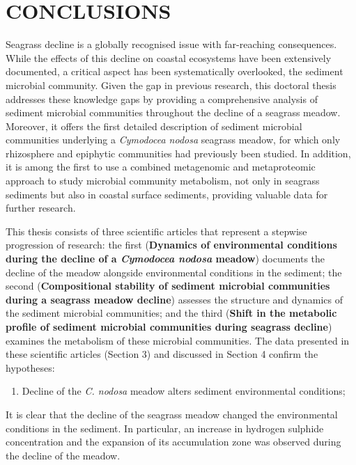 \documentclass[
  12 pt,
]{book}
\providecommand{\tightlist}{%
  \setlength{\itemsep}{0pt}\setlength{\parskip}{0pt}}
\begin{document}
\hypertarget{conclusions}{%
\chapter{CONCLUSIONS}\label{conclusions}}

Seagrass decline is a globally recognised issue with far-reaching consequences. While the effects of this decline on coastal ecosystems have been extensively documented, a critical aspect has been systematically overlooked, the sediment microbial community. Given the gap in previous research, this doctoral thesis addresses these knowledge gaps by providing a comprehensive analysis of sediment microbial communities throughout the decline of a seagrass meadow. Moreover, it offers the first detailed description of sediment microbial communities underlying a \emph{Cymodocea nodosa} seagrass meadow, for which only rhizosphere and epiphytic communities had previously been studied. In addition, it is among the first to use a combined metagenomic and metaproteomic approach to study microbial community metabolism, not only in seagrass sediments but also in coastal surface sediments, providing valuable data for further research.

This thesis consists of three scientific articles that represent a stepwise progression of research: the first (\textbf{Dynamics of environmental conditions during the decline of a \emph{Cymodocea nodosa} meadow}) documents the decline of the meadow alongside environmental conditions in the sediment; the second (\textbf{Compositional stability of sediment microbial communities during a seagrass meadow decline}) assesses the structure and dynamics of the sediment microbial communities; and the third (\textbf{Shift in the metabolic profile of sediment microbial communities during seagrass decline}) examines the metabolism of these microbial communities. The data presented in these scientific articles (Section 3) and discussed in Section 4 confirm the hypotheses:

\begin{enumerate}
\def\labelenumi{\arabic{enumi}.}
\tightlist
\item
  Decline of the \emph{C. nodosa} meadow alters sediment environmental conditions;
\end{enumerate}

It is clear that the decline of the seagrass meadow changed the environmental conditions in the sediment. In particular, an increase in hydrogen sulphide concentration and the expansion of its accumulation zone was observed during the decline of the meadow.
\end{document}
